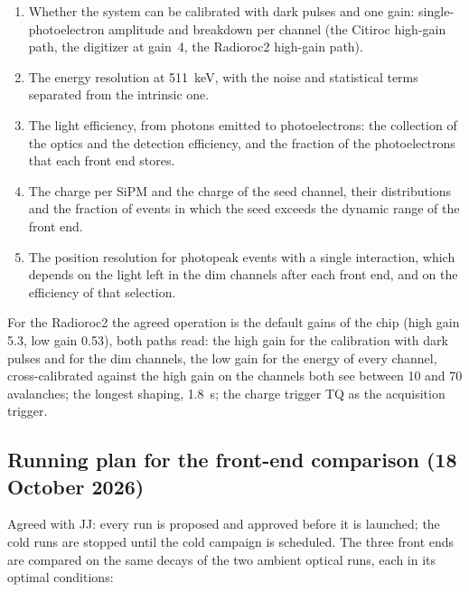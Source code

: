 \documentclass[11pt]{article}
\newcommand{\us}{\textmu s\xspace}
\begin{document}
\begin{enumerate}
\item Whether the system can be calibrated with dark pulses and one gain:
  single-photoelectron amplitude and breakdown per channel (the Citiroc
  high-gain path, the digitizer at gain~4, the Radioroc2 high-gain path).
\item The energy resolution at 511~keV, with the noise and statistical terms
  separated from the intrinsic one.
\item The light efficiency, from photons emitted to photoelectrons: the
  collection of the optics and the detection efficiency, and the fraction of
  the photoelectrons that each front end stores.
\item The charge per SiPM and the charge of the seed channel, their
  distributions and the fraction of events in which the seed exceeds the
  dynamic range of the front end.
\item The position resolution for photopeak events with a single
  interaction, which depends on the light left in the dim channels after each
  front end, and on the efficiency of that selection.
\end{enumerate}

For the Radioroc2 the agreed operation is the default gains of the chip
(high gain 5.3, low gain 0.53), both paths read: the high gain for the
calibration with dark pulses and for the dim channels, the low gain for the
energy of every channel, cross-calibrated against the high gain on the
channels both see between 10 and 70 avalanches; the longest shaping,
1.8~\us; the charge trigger TQ as the acquisition trigger.

\subsection*{Running plan for the front-end comparison (18 October 2026)}

Agreed with JJ: every run is proposed and approved before it is launched;
the cold runs are stopped until the cold campaign is scheduled. The three
front ends are compared on the same decays of the two ambient optical runs,
each in its optimal conditions:
\end{document}

